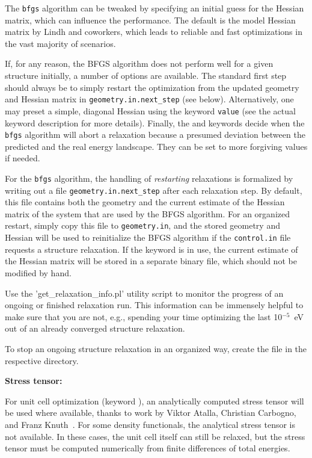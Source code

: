 The \texttt{bfgs} algorithm can be tweaked by specifying an initial
guess for the Hessian matrix, which can influence the performance. The
default is the model Hessian matrix by Lindh and
coworkers,\cite{Lin95} which leads to reliable and fast optimizations in
the vast majority of scenarios.

If, for any reason, the BFGS algorithm
does not perform well for a given structure initially, a number of
options are available. The standard first step should always be to
simply restart the optimization from the updated geometry and Hessian
matrix in \texttt{geometry.in.next\_step} (see below). Alternatively,
one may preset a simple, diagonal Hessian using the keyword
  \texttt{value} (see the actual
keyword description for more details). Finally, the
 and 
keywords decide when the \texttt{bfgs} algorithm will abort a
relaxation because a presumed deviation between the predicted and the
real energy landscape. They can be set to more forgiving values if
needed. 

For the  \texttt{bfgs} algorithm, the
handling of \emph{restarting} relaxations is formalized by writing out
a file \texttt{geometry.in.next\_step} after each relaxation
step. By default, this file contains 
both the geometry and the current estimate of the Hessian matrix of
the system that are used by the BFGS algorithm. For an organized
restart, simply copy this file to \texttt{geometry.in}, and the stored
geometry and Hessian will be used to reinitialize the BFGS algorithm
if the \texttt{control.in} file requests a structure relaxation. If the
keyword  is in use, the current estimate of the
Hessian matrix will be stored in a separate binary file, which should not be
modified by hand.

Use the 'get\_relaxation\_info.pl' utility script to monitor the
progress of an ongoing or finished relaxation run. This information
can be immensely helpful to make sure that you are not, e.g., spending
your time optimizing the last 10$^{-5}$~eV out of an already converged 
structure relaxation.

To stop an ongoing structure relaxation in an organized way, create
the  file in the respective directory.

\textbf{Stress tensor:}

For unit cell optimization (keyword ), an
analytically computed stress tensor will be used where available,
thanks to work by Viktor Atalla, Christian Carbogno, and Franz 
Knuth~\cite{Knuth2015}. For some density functionals, the analytical
stress tensor is not available. In these cases, the unit cell itself
can still be relaxed, but the stress tensor must be computed
numerically from finite differences of total energies. 

